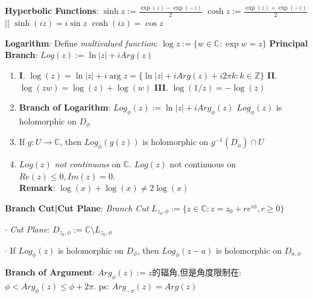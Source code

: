 \documentclass[9pt]{article}
\begin{document}
\textbf{Hyperbolic Functions}: $\sinh z:=\frac{\exp(z)-\exp(-z)}{2}$ \quad \quad $\cosh z:=\frac{\exp(z)+\exp(-z)}{2}$ \quad \quad || \quad \quad $\sinh(iz)=i\sin z$ \quad $\cosh(iz)=\cos z$

\textbf{Logarithm}: Define \textit{multivalued function}: $\log{z}:=\{w\in\mathbb{C}:\exp{w}=z\}$ \quad \quad \quad \textbf{Principal Branch}: $Log(z):=\ln|z|+iArg(z)$

\begin{enumerate}[itemsep=-2pt, topsep=-2pt]
    \item \textbf{I}. $\log(z)=\ln |z|+i\arg{z}=\{\ln |z|+iArg(z) +i2\pi k:k\in\mathbb{Z}\}$ \quad \quad \textbf{II}. $\log(zw)=\log(z)+\log(w)$ \quad \quad \textbf{III}. $\log(1/z)=-\log(z)$
    \item \textbf{Branch of Logarithm}: $Log_{\phi}(z):=\ln|z|+iArg_{\phi}(z)$ \quad \quad $Log_\phi(z)$ is holomorphic on $D_{\phi}$ \\
    \noindent
    \vspace{-3cm}
    \item If $g:U\to\mathbb{C}$, then $Log_\phi(g(z))$ is holomorphic on $g^{-1}(D_{\phi})\cap U$
    \item $Log(z)$ \textit{not continuous} on $\mathbb{C}$. \quad \quad $Log(z)$ not continuous on $Re(z)\leq 0,Im(z)=0$. \\
    \textbf{Remark}: $\log(x)+\log(x)\ne 2\log(x)$
\end{enumerate}

\textbf{Branch Cut|Cut Plane}: \textit{Branch Cut} $L_{z_0,\phi}:=\{z\in\mathbb{C}:z=z_0+re^{i\phi},r\geq0\}$

$\cdot$ \textit{Cut Plane}: $D_{z_0,\phi}:=\mathbb{C}\setminus L_{z_0,\phi}$ 

$\cdot$ If $Log_{\phi}(z)$ is holomorphic on $D_{\phi}$, then $Log_{\phi}(z-a)$ is holomorphic on $D_{a,\phi}$

\textbf{Branch of Argument}: $Arg_{\phi}(z):=z${\small 的辐角,但是角度限制在:} $\phi<Arg_\phi(z)\leq \phi+2\pi$. \quad \quad ps: {\footnotesize $Arg_{-\pi}(z)=Arg(z)$}
\end{document}
